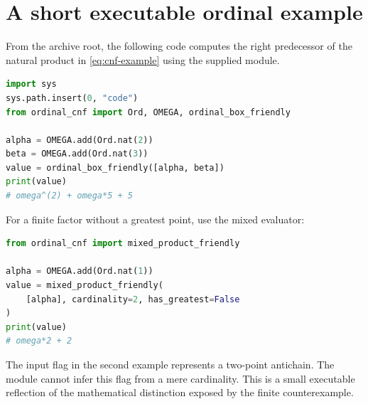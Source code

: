 \documentclass[11pt,letterpaper]{article}
\theoremstyle{definition}
\theoremstyle{remark}
\begin{document}
\clearpage
\section{A short executable ordinal example}\label{app:code}

From the archive root, the following code computes the right predecessor
of the natural product in \eqref{eq:cnf-example} using the supplied module.
\begin{lstlisting}[language=Python]
import sys
sys.path.insert(0, "code")
from ordinal_cnf import Ord, OMEGA, ordinal_box_friendly

alpha = OMEGA.add(Ord.nat(2))
beta = OMEGA.add(Ord.nat(3))
value = ordinal_box_friendly([alpha, beta])
print(value)
# omega^(2) + omega*5 + 5
\end{lstlisting}

For a finite factor without a greatest point, use the mixed evaluator:
\begin{lstlisting}[language=Python]
from ordinal_cnf import mixed_product_friendly

alpha = OMEGA.add(Ord.nat(1))
value = mixed_product_friendly(
    [alpha], cardinality=2, has_greatest=False
)
print(value)
# omega*2 + 2
\end{lstlisting}

The input flag in the second example represents a two-point antichain.
The module cannot infer this flag from a mere cardinality. This is a
small executable reflection of the mathematical distinction exposed by
the finite counterexample.
\end{document}
